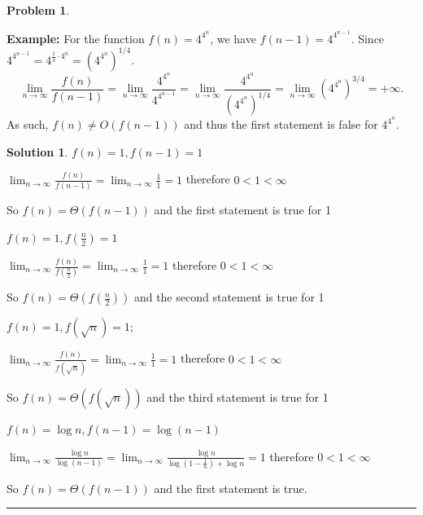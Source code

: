 \documentclass{article}
\theoremstyle{definition}
\newtheorem{problem}{Problem}
\def\fline{\rule{0.75\linewidth}{0.5pt}}
\newcommand{\finishline}{\begin{center}\fline\end{center}}
\newtheorem*{solution*}{Solution}
\newenvironment{solution}{\begin{solution*}}{{\finishline} \end{solution*}}
\begin{document}
\begin{problem}
\begin{enumerate}
    \smallskip
	\textbf{Example:} For the function $f(n) = 4^{4^n}$, we have $f(n-1) = 4^{4^{n-1}}$.  Since $4^{4^{n-1}}= 4^{\frac{1}{4} \cdot 4^n} = (4^{4^{n}})^{1/4}$.
	\[
		\lim_{n \to \infty}\frac{f(n)}{f(n-1)} = \lim_{n \to \infty}\frac{4^{4^{n}}}{4^{4^{n-1}}} = \lim_{n \to \infty}\frac{4^{4^{n}}}{(4^{4^{n}})^{1/4}} = \lim_{n \to \infty}(4^{4^{n}})^{3/4} = +\infty.
	\]	
	As such, $f(n) \neq O(f(n-1))$ and thus the first statement is false for $4^{4^n}$.

    \end{enumerate}
    
    \begin{solution}
	
	\item $f(n) = 1, f(n-1) = 1 $
	\begin{center}
		\item $\lim_{n \to \infty}\frac{f(n)}{f(n-1)} = \lim_{n \to \infty}\frac{1}{1} = 1$ therefore $0 < 1 < \infty$ 
		\item So $f(n) = \Theta(f(n-1))$ and the first statement is true for 1
	\end{center}

	\item $f(n) = 1, f(\frac{n}{2}) = 1$
	\begin{center}
		\item $\lim_{n \to \infty}\frac{f(n)}{f(\frac{n}{2})} = \lim_{n \to \infty}\frac{1}{1} = 1$ therefore $0 < 1 < \infty$ 
		\item So $f(n) = \Theta(f(\frac{n}{2}))$ and the second statement is true for 1
	\end{center}	

	 \item $f(n) = 1, f(\sqrt n) = 1$;
	\begin{center}
		\item $\lim_{n \to \infty}\frac{f(n)}{f(\sqrt n)} = \lim_{n \to \infty}\frac{1}{1} = 1$ therefore $0 < 1 < \infty$ 
		\item So $f(n) = \Theta(f(\sqrt n))$ and the third statement is true for 1
	\end{center}
	
	\item $f(n) = \log n, f(n-1) = \log (n-1)$
	\begin{center}
		\item $\lim_{n \to \infty}\frac{\log n}{\log (n-1)} = \lim_{n \to \infty}\frac{\log n}{\log (1 -\frac{1}{n}) + \log n} = 1$ therefore $0 < 1 < \infty$ 
		\item So $f(n) = \Theta(f(n-1))$ and the first statement is true.
	\end{center}


\end{solution}
\end{problem}
\end{document}
